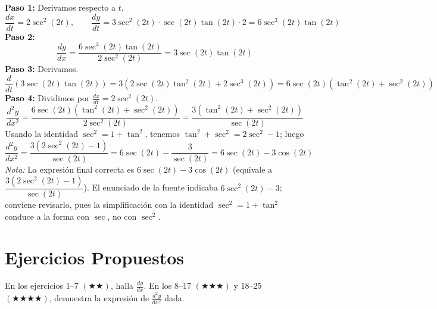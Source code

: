 \documentclass[12pt, letterpaper]{article}
\begin{document}
\begin{cuadrosolucion}
  \textbf{Paso 1:} Derivamos respecto a $t$.
  \[
    \frac{dx}{dt} = 2\sec^2(2t), \qquad
    \frac{dy}{dt} = 3\sec^2(2t)\cdot\sec(2t)\tan(2t)\cdot 2 = 6\sec^3(2t)\tan(2t)
  \]
  \textbf{Paso 2:}
  \[
    \frac{dy}{dx} = \frac{6\sec^3(2t)\tan(2t)}{2\sec^2(2t)} = 3\sec(2t)\tan(2t)
  \]
  \textbf{Paso 3:} Derivamos.
  \[
    \frac{d}{dt}\left(3\sec(2t)\tan(2t)\right)
    = 3\left(2\sec(2t)\tan^2(2t) + 2\sec^3(2t)\right)
    = 6\sec(2t)\left(\tan^2(2t) + \sec^2(2t)\right)
  \]
  \textbf{Paso 4:} Dividimos por $\frac{dx}{dt} = 2\sec^2(2t)$.
  \[
    \frac{d^2y}{dx^2}
    = \frac{6\sec(2t)\left(\tan^2(2t)+\sec^2(2t)\right)}{2\sec^2(2t)}
    = \frac{3\left(\tan^2(2t)+\sec^2(2t)\right)}{\sec(2t)}
  \]
  Usando la identidad $\sec^2 = 1 + \tan^2$, tenemos $\tan^2 + \sec^2 = 2\sec^2 - 1$; luego
  \[
    \frac{d^2y}{dx^2}
    = \frac{3\left(2\sec^2(2t)-1\right)}{\sec(2t)}
    = 6\sec(2t) - \frac{3}{\sec(2t)}
    = 6\sec(2t) - 3\cos(2t)
  \]
  \textit{Nota:} La expresión final correcta es $6\sec(2t) - 3\cos(2t)$ (equivale a $\dfrac{3(2\sec^2(2t)-1)}{\sec(2t)}$). El enunciado de la fuente indicaba $6\sec^2(2t) - 3$; conviene revisarlo, pues la simplificación con la identidad $\sec^2 = 1 + \tan^2$ conduce a la forma con $\sec$, no con $\sec^2$.
\end{cuadrosolucion}

\newpage
\section{Ejercicios Propuestos}

\noindent En los ejercicios 1--7 $(\bigstar\bigstar)$, halla $\frac{dy}{dx}$. En los 8--17 $(\bigstar\bigstar\bigstar)$ y 18--25 $(\bigstar\bigstar\bigstar\bigstar)$, demuestra la expresión de $\frac{d^2y}{dx^2}$ dada.
\end{document}
